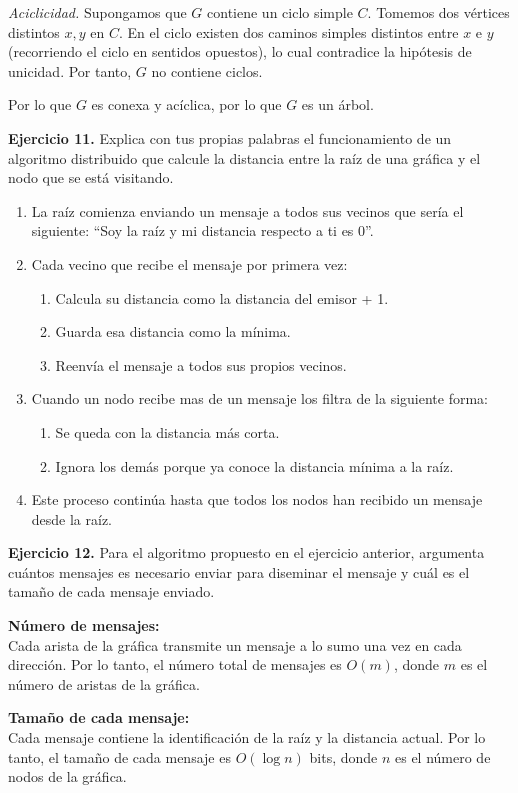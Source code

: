 \documentclass[12pt]{article}
\begin{document}
\emph{Aciclicidad.} Supongamos que $G$ contiene un ciclo simple $C$. Tomemos dos vértices distintos $x,y$ en $C$.  
En el ciclo existen dos caminos simples distintos entre $x$ e $y$ (recorriendo el ciclo en sentidos opuestos), lo cual contradice la hipótesis de unicidad.  
Por tanto, $G$ no contiene ciclos.

Por lo que $G$ es conexa y acíclica, por lo que $G$ es un árbol.


\vspace{0.5cm}
\begin{ejercicio}
\textbf{Ejercicio 11.} Explica con tus propias palabras el funcionamiento de un algoritmo distribuido que calcule la distancia entre la raíz de una gráfica y el nodo que se está visitando.
\end{ejercicio}

\begin{enumerate}
    \item La raíz comienza enviando un mensaje a todos sus vecinos que sería el siguiente:  
    ``Soy la raíz y mi distancia respecto a ti es 0''.
    
    \item Cada vecino que recibe el mensaje por primera vez:
    \begin{enumerate}
        \item Calcula su distancia como la distancia del emisor + 1.
        \item Guarda esa distancia como la mínima.
        \item Reenvía el mensaje a todos sus propios vecinos.
    \end{enumerate}

    \item Cuando un nodo recibe mas de un mensaje los filtra de la siguiente forma: 
    \begin{enumerate}
        \item Se queda con la distancia más corta.
        \item Ignora los demás porque ya conoce la distancia mínima a la raíz.
    \end{enumerate}
    
    \item Este proceso continúa hasta que todos los nodos han recibido un mensaje desde la raíz.
\end{enumerate}

\begin{ejercicio}
\textbf{Ejercicio 12.} Para el algoritmo propuesto en el ejercicio anterior, argumenta cuántos mensajes es necesario enviar para diseminar el mensaje y cuál es el tamaño de cada mensaje enviado.
\end{ejercicio}
\noindent \textbf{Número de mensajes:} \\
Cada arista de la gráfica transmite un mensaje a lo sumo una vez en cada dirección. 
Por lo tanto, el número total de mensajes es $O(m)$, donde $m$ es el número de aristas de la gráfica. 

\medskip
\noindent \textbf{Tamaño de cada mensaje:} \\
Cada mensaje contiene la identificación de la raíz y la distancia actual. 
Por lo tanto, el tamaño de cada mensaje es $O(\log n)$ bits, donde $n$ es el número de nodos de la gráfica.


 
\end{document}
